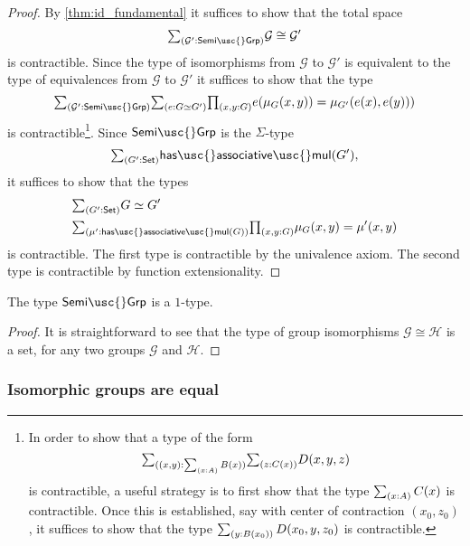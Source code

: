 \begin{proof}
By \cref{thm:id_fundamental} it suffices to show that the total space
\begin{equation*}
\sm{\mathcal{G}':\mathsf{Semi\usc{}Grp}}\mathcal{G}\cong\mathcal{G}'
\end{equation*}
is contractible. Since the type of isomorphisms from $\mathcal{G}$ to $\mathcal{G}'$ is equivalent to the type of equivalences from $\mathcal{G}$ to $\mathcal{G}'$ it suffices to show that the type
\begin{equation*}
  \sm{\mathcal{G}':\mathsf{Semi\usc{}Grp}}\sm{e:\eqv{G}{G'}}\prd{x,y:G}e(\mu_G(x,y))=\mu_{G'}(e(x),e(y)))
\end{equation*}
is contractible\footnote{In order to show that a type of the form
  \begin{equation*}
    \sm{(x,y):\sm{x:A}B(x)}\sm{z:C(x)}D(x,y,z)
  \end{equation*}
  is contractible, a useful strategy is to first show that the type $\sm{x:A}C(x)$ is contractible. Once this is established, say with center of contraction $(x_0,z_0)$, it suffices to show that the type $\sm{y:B(x_0)}D(x_0,y,z_0)$ is contractible.}. Since $\mathsf{Semi\usc{}Grp}$ is the $\Sigma$-type
\begin{equation*}
  \sm{G':\mathsf{Set}}\mathsf{has\usc{}associative\usc{}mul}(G'),
\end{equation*}
it suffices to show that the types
\begin{align*}
  & \sm{G':\mathsf{Set}}\eqv{G}{G'} \\
  & \sm{\mu':\mathsf{has\usc{}associative\usc{}mul}(G)}\prd{x,y:G}\mu_G(x,y)=\mu'(x,y)
\end{align*}
is contractible. The first type is contractible by the univalence axiom. The second type is contractible by function extensionality.
\end{proof}

\begin{cor}
The type $\mathsf{Semi\usc{}Grp}$ is a $1$-type.
\end{cor}

\begin{proof}
It is straightforward to see that the type of group isomorphisms $\mathcal{G}\cong\mathcal{H}$ is a set, for any two groups $\mathcal{G}$ and $\mathcal{H}$.
\end{proof}

\subsubsection{Isomorphic groups are equal}

